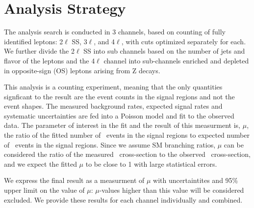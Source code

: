 \section{Analysis Strategy} 


The analysis search is conducted in 3 channels, based on counting of fully identified
leptons: 2$\ell$ SS, 3$\ell$, and 4$\ell$, with cuts optimized separately for each. We further divide the 2$\ell$ SS into sub channels
based on the number of jets and flavor of the leptons and the 4$\ell$ channel into sub-channels enriched and depleted in opposite-sign (OS) leptons arising from Z decays. 

This analysis is a counting experiment, meaning that the only quantities signficant to the result are the event counts in the signal
regions and not the event shapes. The measured background rates, expected signal rates and systematic uncertainties are fed into a Poisson 
model and fit to the observed data. The parameter of interest in the fit and the result of this measurment is, $\mu$, the ratio of the fitted
number of \tth\ events in the signal regions to expected number of \tth\ events in the signal regions. Since we assume SM branching ratios,
$\mu$ can be considered the ratio of the measured \tth\ cross-section to the observed \tth\ cross-section, and we expect the fitted $\mu$ to be
close to 1 with large statistical errors.

We express the final result as a measurment of $\mu$ with uncertaintites and 95\% upper limit on the value of $\mu$: $\mu$-values higher than this
value will be considered excluded. We provide these results for each channel individually and combined.  




